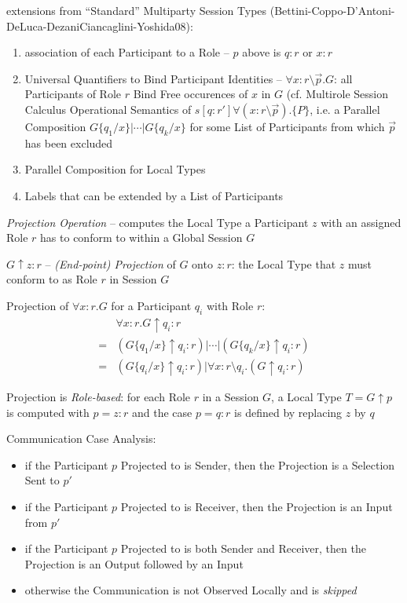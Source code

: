 extensions from ``Standard'' Multiparty Session Types
(Bettini-Coppo-D'Antoni-DeLuca-DezaniCiancaglini-Yoshida08):
\begin{enumerate}
  \item association of each Participant to a Role -- $p$ above is
    $q:r$ or $x:r$
  \item Universal Quantifiers to Bind Participant Identities --
    $\forall x:r \setminus \vec{p}.G$: all Participants of Role $r$
    Bind Free occurences of $x$ in $G$ (cf. Multirole Session Calculus
    Operational Semantics of $s[q:r']\forall(x:r
    \setminus\vec{p}).\{P\}$, i.e. a Parallel Composition $G\{q_1 /
    x\} | \cdots | G\{q_k / x\}$ for some List of Participants from
    which $\vec{p}$ has been excluded
  \item Parallel Composition for Local Types
  \item Labels that can be extended by a List of Participants
\end{enumerate}

\emph{Projection Operation} -- computes the Local Type a Participant
$z$ with an assigned Role $r$ has to conform to within a Global
Session $G$

$G \uparrow z:r$ -- \emph{(End-point) Projection} of $G$ onto $z:r$:
the Local Type that $z$ must conform to as Role $r$ in Session $G$

Projection of $\forall x:r.G$ for a Participant $q_i$ with Role $r$:
\begin{align*}
    & \forall x:r.G \uparrow q_i:r \\
  = & (G\{q_1/x\} \uparrow q_i:r) | \cdots |
    (G\{q_k/x\} \uparrow q_i:r) \\
  = & (G\{q_i/x\} \uparrow q_i:r) |
    \forall x:r \setminus q_i.(G \uparrow q_i:r)
\end{align*}

Projection is \emph{Role-based}: for each Role $r$ in a Session $G$, a
Local Type $T = G \uparrow p$ is computed with $p = z:r$ and the case
$p = q:r$ is defined by replacing $z$ by $q$


Communication Case Analysis:
\begin{itemize}
  \item if the Participant $p$ Projected to is Sender, then the
    Projection is a Selection Sent to $p'$
  \item if the Participant $p$ Projected to is Receiver, then the
    Projection is an Input from $p'$
  \item if the Participant $p$ Projected to is both Sender and
    Receiver, then the Projection is an Output followed by an Input
  \item otherwise the Communication is not Observed Locally and is
    \emph{skipped}
\end{itemize}

